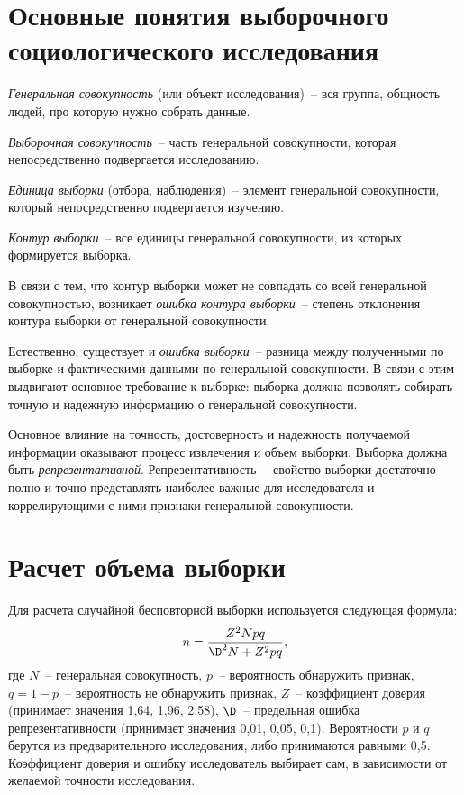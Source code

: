  \section{Основные понятия выборочного социологического исследования}

    \emph{Генеральная совокупность} (или объект исследования)~-- вся группа,
    общность людей, про которую нужно собрать данные.

    \emph{Выборочная совокупность}~-- часть генеральной совокупности, которая
    непосредственно подвергается исследованию.

    \emph{Единица выборки} (отбора, наблюдения)~-- элемент генеральной
    совокупности, который непосредственно подвергается изучению.

    \emph{Контур выборки}~-- все единицы генеральной совокупности, из которых
    формируется выборка.

    В связи с тем, что контур выборки может не совпадать со всей генеральной
    совокупностью, возникает \emph{ошибка контура выборки}~-- степень отклонения
    контура выборки от генеральной совокупности.

    Естественно, существует и \emph{ошибка выборки}~-- разница между полученными
    по выборке и фактическими данными по генеральной совокупности. В связи с
    этим выдвигают основное требование к выборке: выборка должна позволять
    собирать точную и надежную информацию о генеральной совокупности.

    Основное влияние на точность, достоверность и надежность получаемой
    информации оказывают процесс извлечения и объем выборки. Выборка должна быть
    \emph{репрезентативной}. Репрезентативность~-- свойство выборки достаточно
    полно и точно представлять наиболее важные для исследователя и
    коррелирующими с ними признаки генеральной совокупности.

  \section{Расчет объема выборки}

    Для расчета случайной бесповторной выборки используется следующая формула:
    \[
      n = \frac{Z^2 Npq}{\D^2 N + Z^2 pq},
    \]
    где \( N \)~-- генеральная совокупность, \( p \)~-- вероятность обнаружить
    признак, \( q = 1 - p \)~-- вероятность не обнаружить признак, \( Z \)~--
    коэффициент доверия (принимает значения 1,64, 1,96, 2,58), \( \D \)~--
    предельная ошибка репрезентативности (принимает значения 0,01, 0,05, 0,1).
    Вероятности \( p \) и \( q \) берутся из предварительного исследования,
    либо принимаются равными 0,5. Коэффициент доверия и ошибку исследователь
    выбирает сам, в зависимости от желаемой точности исследования.

